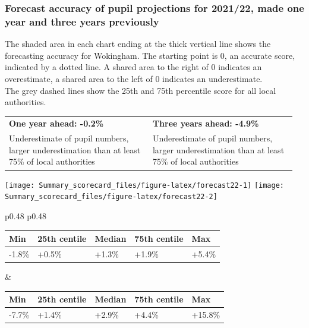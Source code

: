 \documentclass[
]{article}
\begin{document}
\hypertarget{forecast-accuracy-of-pupil-projections-for-202122-made-one-year-and-three-years-previously}{%
\subsubsection{Forecast accuracy of pupil projections for 2021/22, made
one year and three years
previously}\label{forecast-accuracy-of-pupil-projections-for-202122-made-one-year-and-three-years-previously}}

The shaded area in each chart ending at the thick vertical line shows
the forecasting accuracy for Wokingham. The starting point is 0, an
accurate score, indicated by a dotted line. A shared area to the right
of 0 indicates an overestimate, a shared area to the left of 0 indicates
an underestimate.\\
The grey dashed lines show the 25th and 75th percentile score for all
local authorities.

\begin{tabular}{p{0.48\linewidth} p{0.48\linewidth} }\bf\large\color{dfeheadingblue} One year ahead: -0.2\% \ & \bf\large\color{dfeheadingblue} Three years ahead: -4.9\% \ \\Underestimate of pupil numbers, larger underestimation than at least 75\% of local authorities&Underestimate of pupil numbers, larger underestimation than at least 75\% of local authorities \\\end{tabular}

\texttt{[image: Summary\_scorecard\_files/figure-latex/forecast22-1]}
\texttt{[image: Summary\_scorecard\_files/figure-latex/forecast22-2]}

\begin{tabular}{p{0.48\linewidth} p{0.48\linewidth} }\footnotesize \centering 
\begin{tabular}{lllll}
\toprule
Min & 25th centile & Median & 75th centile & Max\\
\midrule
-1.8\% & +0.5\% & +1.3\% & +1.9\% & +5.4\%\\
\bottomrule
\end{tabular}
&\footnotesize \centering 
\begin{tabular}{lllll}
\toprule
Min & 25th centile & Median & 75th centile & Max\\
\midrule
-7.7\% & +1.4\% & +2.9\% & +4.4\% & +15.8\%\\
\bottomrule
\end{tabular}
\end{tabular}
\end{document}
